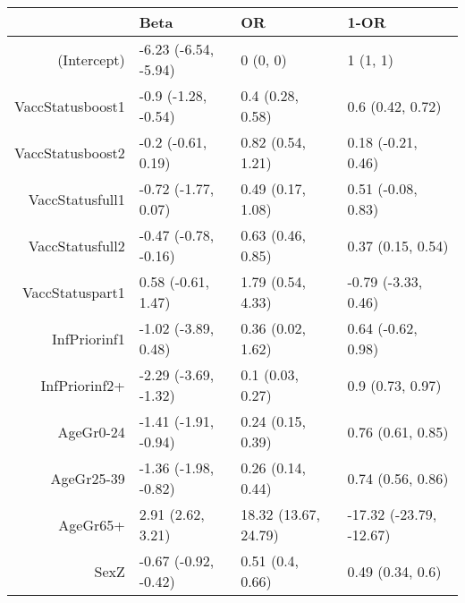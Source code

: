 \begin{table}[ht]
\centering
\begin{tabular}{rlll}
  \hline
 & Beta & OR & 1-OR \\ 
  \hline
(Intercept) & -6.23 (-6.54, -5.94) & 0 (0, 0) & 1 (1, 1) \\ 
  VaccStatusboost1 & -0.9 (-1.28, -0.54) & 0.4 (0.28, 0.58) & 0.6 (0.42, 0.72) \\ 
  VaccStatusboost2 & -0.2 (-0.61, 0.19) & 0.82 (0.54, 1.21) & 0.18 (-0.21, 0.46) \\ 
  VaccStatusfull1 & -0.72 (-1.77, 0.07) & 0.49 (0.17, 1.08) & 0.51 (-0.08, 0.83) \\ 
  VaccStatusfull2 & -0.47 (-0.78, -0.16) & 0.63 (0.46, 0.85) & 0.37 (0.15, 0.54) \\ 
  VaccStatuspart1 & 0.58 (-0.61, 1.47) & 1.79 (0.54, 4.33) & -0.79 (-3.33, 0.46) \\ 
  InfPriorinf1 & -1.02 (-3.89, 0.48) & 0.36 (0.02, 1.62) & 0.64 (-0.62, 0.98) \\ 
  InfPriorinf2+ & -2.29 (-3.69, -1.32) & 0.1 (0.03, 0.27) & 0.9 (0.73, 0.97) \\ 
  AgeGr0-24 & -1.41 (-1.91, -0.94) & 0.24 (0.15, 0.39) & 0.76 (0.61, 0.85) \\ 
  AgeGr25-39 & -1.36 (-1.98, -0.82) & 0.26 (0.14, 0.44) & 0.74 (0.56, 0.86) \\ 
  AgeGr65+ & 2.91 (2.62, 3.21) & 18.32 (13.67, 24.79) & -17.32 (-23.79, -12.67) \\ 
  SexZ & -0.67 (-0.92, -0.42) & 0.51 (0.4, 0.66) & 0.49 (0.34, 0.6) \\ 
   \hline
\end{tabular}
\end{table}

